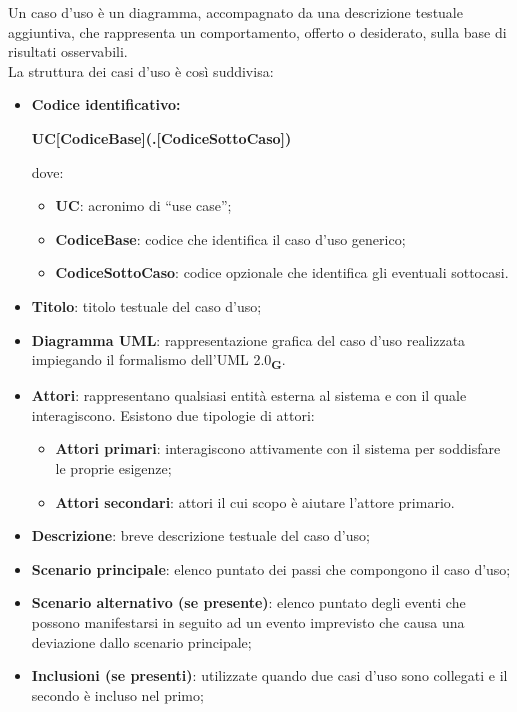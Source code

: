 Un caso d’uso è un diagramma, accompagnato da una descrizione testuale aggiuntiva, che rappresenta un comportamento, offerto o desiderato, sulla base di risultati osservabili.
\\La struttura dei casi d’uso è così suddivisa:
\begin{itemize}
    \item \textbf{Codice identificativo:}
          \begin{center}
              \textbf{UC[CodiceBase](.[CodiceSottoCaso])}
          \end{center}
          dove:
          \begin{itemize}
              \item \textbf{UC}: acronimo di “use case”;
              \item \textbf{CodiceBase}: codice che identifica il caso d’uso generico;
              \item \textbf{CodiceSottoCaso}: codice opzionale che identifica gli eventuali sottocasi.
          \end{itemize}
    \item \textbf{Titolo}: titolo testuale del caso d’uso;
    \item \textbf{Diagramma UML}: rappresentazione grafica del caso d’uso realizzata impiegando il formalismo dell’UML 2.0\textsubscript{\textbf{G}}.
    \item \textbf{Attori}: rappresentano qualsiasi entità esterna al sistema e con il quale interagiscono. Esistono due tipologie di attori:\begin{itemize}
              \item \textbf{Attori primari}: interagiscono attivamente con il sistema per soddisfare le proprie esigenze;
              \item \textbf{Attori secondari}: attori il cui scopo è aiutare l’attore primario.
          \end{itemize}
    \item \textbf{Descrizione}: breve descrizione testuale del caso d’uso;
    \item \textbf{Scenario principale}: elenco puntato dei passi che compongono il caso d’uso;
    \item \textbf{Scenario alternativo (se presente)}: elenco puntato degli eventi che possono manifestarsi in seguito ad un evento imprevisto che causa una deviazione dallo scenario principale;
    \item \textbf{Inclusioni (se presenti)}: utilizzate quando due casi d’uso sono collegati e il secondo è incluso nel primo;

\end{itemize}
